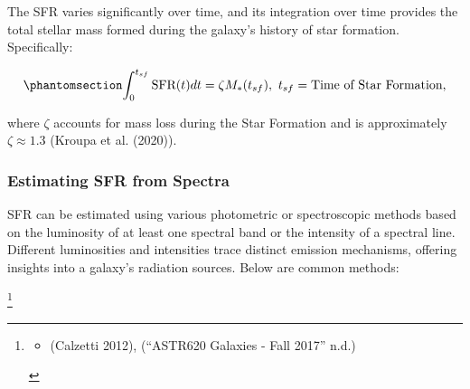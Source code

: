 \documentclass[
]{article}
\providecommand{\tightlist}{%
  \setlength{\itemsep}{0pt}\setlength{\parskip}{0pt}}\usepackage{longtable,booktabs,array}
\begin{document}
The SFR varies significantly over time, and its integration over time
provides the total stellar mass formed during the galaxy's history of
star formation. Specifically:

\begin{equation}\phantomsection\label{eq-sfr_int}{
\int_0^{t_{sf}} \text{SFR}(t)dt = \zeta M_*(t_{sf}),\ t_{sf}=\text{Time of Star Formation,} 
}\end{equation}

where \(\zeta\) accounts for mass loss during the Star Formation and is
approximately \(\zeta \approx 1.3\) (Kroupa et al. (2020)).

\subsubsection{Estimating SFR from
Spectra}\label{estimating-sfr-from-spectra}

SFR can be estimated using various photometric or spectroscopic methods
based on the luminosity of at least one spectral band or the intensity
of a spectral line. Different luminosities and intensities trace
distinct emission mechanisms, offering insights into a galaxy's
radiation sources. Below are common methods:

\footnote{\begin{itemize}
  \tightlist
  \item
    (Calzetti 2012), ({``{ASTR620 Galaxies} - {Fall} 2017''} n.d.)
  \end{itemize}}
\end{document}
